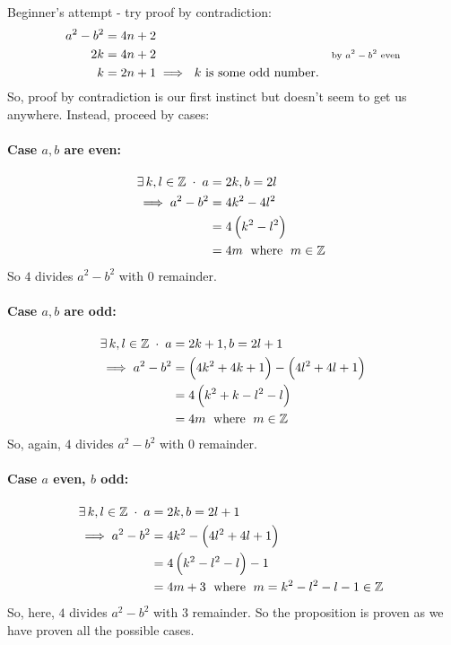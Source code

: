 \documentclass[../MathsNotesBase.tex]{subfiles}
\begin{document}
{		\bigskip
		Beginner's attempt - try proof by contradiction:
		\begin{align*}
		a^2 - b^2 &= 4n + 2 \\
		2k &= 4n + 2 &\text{\scriptsize{by $a^2 - b^2$ even}}\\
		k &= 2n + 1 \implies \text{ $k$ is some odd number.}
		\end{align*}
		So, proof by contradiction is our first instinct but doesn't seem to get us anywhere.
		Instead, proceed by cases:
		\paragraph{Case $a, b$ are even:}
		\begin{align*}
		\exists\,k,l \in \mathbb{Z}^{\;} \cdot \;a &= 2k, b = 2l \\
		\implies a^2 - b^2 &= 4k^2 - 4l^2 \\
		&= 4\left(k^2 - l^2\right) \\
		&= 4m\; \text{ where } \;m \in \mathbb{Z}^{\;}  \\
		\end{align*}
		So $4$ divides $a^2 - b^2$ with $0$ remainder.
		\paragraph{Case $a, b$ are odd:}
		\begin{align*}
		\exists\,k,l \in \mathbb{Z}^{\;} \cdot \;a &= 2k+1, b = 2l+1 \\
		\implies a^2 - b^2 &= \left(4k^2 + 4k + 1\right) - \left(4l^2 + 4l + 1\right) \\
		&= 4\left(k^2 + k - l^2 - l\right) \\
		&= 4m\; \text{ where } \;m \in \mathbb{Z}^{\;}  \\
		\end{align*}
		So, again, $4$ divides $a^2 - b^2$ with $0$ remainder.
		\paragraph{Case $a$ even, $b$ odd:}
		\begin{align*}
		\exists\,k,l \in \mathbb{Z}^{\;} \cdot \;a &= 2k, b = 2l+1 \\
		\implies a^2 - b^2 &= 4k^2 - \left(4l^2 + 4l + 1\right) \\
		&= 4\left(k^2 - l^2 - l\right) - 1 \\
		&= 4m + 3\; \text{ where } \;m=k^2 - l^2 - l - 1 \in \mathbb{Z}^{\;}  \\
		\end{align*}
		So, here, $4$ divides $a^2 - b^2$ with $3$ remainder. So the proposition is proven as we have proven all the possible cases.\\
	}
	
\end{document}
